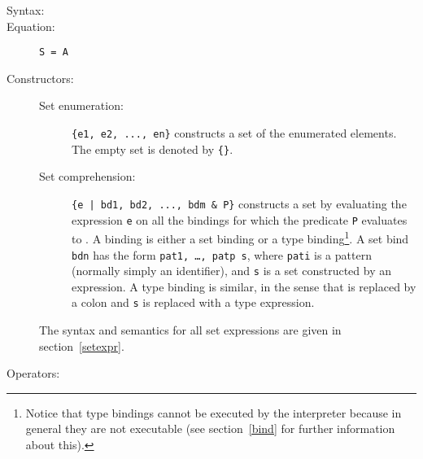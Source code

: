\documentclass[\pformat,12pt]{article}
\begin{document}
\begin{description}
\item[Syntax:] 
  

\item[Equation:] {\tt S =  A}

\item[Constructors:] \mbox{}

  \begin{description}
  \item[Set enumeration:] \verb|{e1, e2, ..., en}| constructs a set of the
    enumerated elements. The empty set is denoted by {\tt \{\}}.
  
  \item[Set comprehension:] \verb+{e | bd1, bd2, ..., bdm & P}+
    constructs a set by evaluating the expression {\tt e} on all the
    bindings for which the predicate {\tt P} evaluates to .
    A binding is either a set binding or a type
    binding\footnote{Notice that type bindings cannot be executed by
      the interpreter because in general
      they are not executable (see section~\ref{bind} for further
      information about this).}.  A set bind {\tt bdn} has the form
    {\tt pat1, \ldots, patp  s}, where {\tt pati} is a
    pattern (normally simply an identifier), and {\tt s} is a set
    constructed by an expression. A type binding is similar, in the
    sense that  is replaced by a colon and {\tt s} is
    replaced with a type expression.
  \end{description}
  The syntax and semantics for all set expressions are given in
  section~\ref{setexpr}.%
\item[Operators:] \mbox{}


\end{description}
\end{document}
